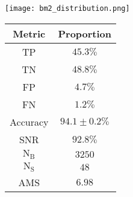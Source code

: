 \begin{minipage}{\textwidth}
  \begin{minipage}[htbp]{0.65\textwidth}
    \centering
    \texttt{[image: bm2\_distribution.png]}
    \label{fig:dist_bm2}
  \end{minipage}
  \hfill
  \begin{minipage}[htbp]{0.34\textwidth}
        \centering
        \begin{tabular}{c|c} 
        \toprule
        Metric & Proportion \\
        \midrule
        \rowcolor{gray!6} TP & $45.3 \%$ \\
        TN & $48.8 \%$ \\
        \rowcolor{gray!6} FP & $4.7 \%$\\
        FN & $1.2 \%$ \\
        \rowcolor{gray!6} Accuracy & $94.1 \pm 0.2 \%$ \\
        SNR & $92.8 \%$ \\
        \midrule
        \rowcolor{gray!6} $\text{N}_\text{B}$ & $3250$ \\
        $\text{N}_\text{S}$ & $48$ \\
        \rowcolor{gray!6} AMS & $6.98$ \\
        \bottomrule
        \end{tabular}
        \label{tab:Values2}
    \end{minipage}
\end{minipage}

